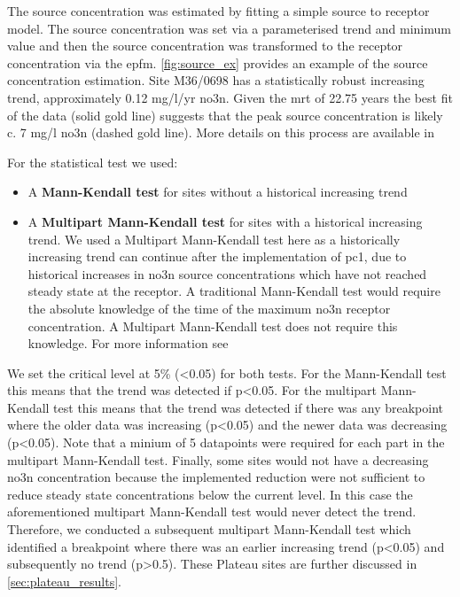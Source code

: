 The source concentration was estimated by fitting a simple source to receptor model. The source concentration was set via a parameterised trend and minimum value and then the source concentration was transformed to the receptor concentration via the \gls{epfm}. \autoref{fig:source_ex} provides an example of the source concentration estimation. Site M36/0698 has a statistically robust increasing trend, approximately 0.12 mg/l/yr \gls{no3n}. Given the \gls{mrt} of 22.75 years the best fit of the data (solid gold line) suggests that the peak source concentration is likely c. 7 mg/l \gls{no3n} (dashed gold line). More details on this process are available in \citet{dumont_determining_nodate, dumont_komanawagw_age_tools_2023}


For the statistical test we used:
\begin{itemize}
    \item A \textbf{Mann-Kendall test} for sites without a historical increasing trend
    \item A \textbf{Multipart Mann-Kendall test} for sites with a historical increasing trend. We used a Multipart Mann-Kendall test here as a historically increasing trend can continue after the implementation of \gls{pc1}, due to historical increases in \gls{no3n} source concentrations which have not reached steady state at the receptor. A traditional Mann-Kendall test would require the absolute knowledge of the time of the maximum \gls{no3n} receptor concentration. A Multipart Mann-Kendall test does not require this knowledge. For more information see \citet{dumont_komanawakendall_stats_2023}
\end{itemize}

We set the critical level at 5\% (<0.05) for both tests. For the Mann-Kendall test this means that the trend was detected if p<0.05. For the multipart Mann-Kendall test this means that the trend was detected if there was any breakpoint where the older data was increasing (p<0.05) and the newer data was decreasing (p<0.05). Note that a minium of 5 datapoints were required for each part in the multipart Mann-Kendall test. Finally, some sites would not have a decreasing \gls{no3n} concentration because the implemented reduction were not sufficient to reduce steady state concentrations below the current level. In this case the aforementioned multipart Mann-Kendall test would never detect the trend. Therefore, we conducted a subsequent multipart Mann-Kendall test which identified a breakpoint where there was an earlier increasing trend (p<0.05) and subsequently no trend (p>0.5). These Plateau sites are further discussed in \autoref{sec:plateau_results}.

